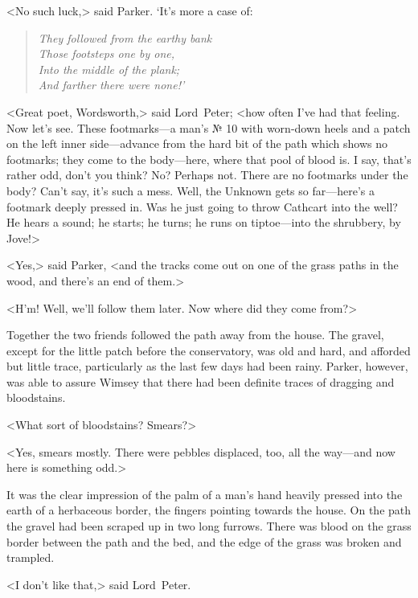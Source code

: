 <No such luck,> said Parker. `It's more a case of:
\vspace{-1ex}
\begin{quote}\itshape
They followed from the earthy bank\\
Those footsteps one by one,\\
Into the middle of the plank;\\
And farther there were none!'\end{quote}

<Great poet, Wordsworth,> said Lord~Peter; <how often I've had that feeling. Now let's see. These footmarks—a man's № 10 with worn-down heels and a patch on the left inner side—advance from the hard bit of the path which shows no footmarks; they come to the body—here, where that pool of blood is. I say, that's rather odd, don't you think? No? Perhaps not. There are no footmarks under the body? Can't say, it's such a mess. Well, the Unknown gets so far—here's a footmark deeply pressed in. Was he just going to throw Cathcart into the well? He hears a sound; he starts; he turns; he runs on tiptoe—into the shrubbery, by Jove!>

<Yes,> said Parker, <and the tracks come out on one of the grass paths in the wood, and there's an end of them.>

<H'm! Well, we'll follow them later. Now where did they come from?>

Together the two friends followed the path away from the house. The gravel, except for the little patch before the conservatory, was old and hard, and afforded but little trace, particularly as the last few days had been rainy. Parker, however, was able to assure Wimsey that there had been definite traces of dragging and bloodstains.

<What sort of bloodstains? Smears?>

<Yes, smears mostly. There were pebbles displaced, too, all the way—and now here is something odd.>

It was the clear impression of the palm of a man's hand heavily pressed into the earth of a herbaceous border, the fingers pointing towards the house. On the path the gravel had been scraped up in two long furrows. There was blood on the grass border between the path and the bed, and the edge of the grass was broken and trampled.

<I don't like that,> said Lord~Peter.

